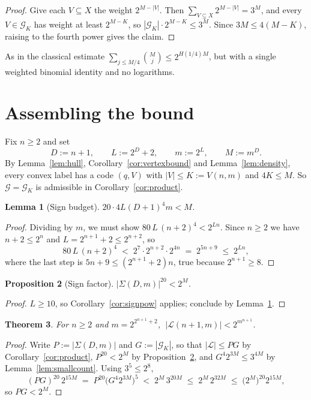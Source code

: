 \documentclass[11pt,a4paper]{article}
\theoremstyle{plain}
\newtheorem{theorem}{Theorem}[section]
\newtheorem{proposition}[theorem]{Proposition}
\newtheorem{lemma}[theorem]{Lemma}
\theoremstyle{definition}
\begin{document}
\begin{proof}
Give each $V\subseteq X$ the weight $2^{M-|V|}$. Then $\sum_{V\subseteq X}2^{M-|V|}=3^{M}$, and
every $V\in\mathcal{G}_K$ has weight at least $2^{M-K}$, so $|\mathcal{G}_K|\cdot2^{M-K}\le3^{M}$.
Since $3M\le4(M-K)$, raising to the fourth power gives the claim.
\end{proof}

As in the classical estimate $\sum_{j\le M/4}\binom Mj\le2^{H(1/4)M}$, but with a single weighted
binomial identity and no logarithms.

\section{Assembling the bound}\label{sec:numerics}

Fix $n\ge2$ and set
\[
  D:=n+1,\qquad L:=2^{D}+2,\qquad m:=2^{L},\qquad M:=m^{D}.
\]
By Lemma~\ref{lem:hull}, Corollary~\ref{cor:vertexbound} and Lemma~\ref{lem:density}, every convex
label has a code $(q,V)$ with $|V|\le K:=V(n,m)$ and $4K\le M$. So
$\mathcal{G}=\mathcal{G}_K$ is admissible in Corollary~\ref{cor:product}.

\begin{lemma}[Sign budget]\label{lem:budget}
$20\cdot4L(D+1)^{4}m<M$.
\end{lemma}

\begin{proof}
Dividing by $m$, we must show $80\,L\,(n+2)^{4}<2^{Ln}$. Since $n\ge2$ we have $n+2\le2^{n}$ and
$L=2^{n+1}+2\le2^{n+2}$, so
\[
  80\,L\,(n+2)^{4}\;<\;2^{7}\cdot2^{n+2}\cdot2^{4n}\;=\;2^{5n+9}\;\le\;2^{Ln},
\]
where the last step is $5n+9\le(2^{n+1}+2)n$, true because $2^{n+1}\ge8$.
\end{proof}

\begin{proposition}[Sign factor]\label{prop:signfactor}
$\bigl|\Sigma(D,m)\bigr|^{20}<2^{M}$.
\end{proposition}

\begin{proof}
$L\ge10$, so Corollary~\ref{cor:signpow} applies; conclude by Lemma~\ref{lem:budget}.
\end{proof}

\begin{theorem}\label{thm:labelcount}
For $n\ge2$ and $m=2^{2^{n+1}+2}$, $\ \bigl|\mathcal{L}(n+1,m)\bigr|<2^{m^{n+1}}$.
\end{theorem}

\begin{proof}
Write $P:=|\Sigma(D,m)|$ and $G:=|\mathcal{G}_K|$, so that $|\mathcal{L}|\le PG$ by
Corollary~\ref{cor:product}, $P^{20}<2^{M}$ by Proposition~\ref{prop:signfactor}, and
$G^{4}2^{3M}\le3^{4M}$ by Lemma~\ref{lem:smallcount}. Using $3^{5}\le2^{8}$,
\[
  (PG)^{20}\,2^{15M}\;=\;P^{20}\bigl(G^{4}2^{3M}\bigr)^{5}
  \;<\;2^{M}\,3^{20M}\;\le\;2^{M}\,2^{32M}\;\le\;\bigl(2^{M}\bigr)^{20}2^{15M},
\]
so $PG<2^{M}$.
\end{proof}
\end{document}
